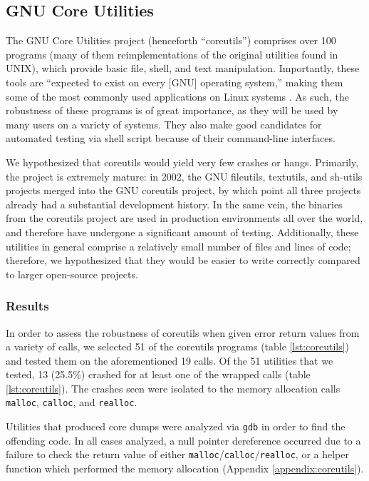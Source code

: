 \subsection{GNU Core Utilities}
The GNU Core Utilities project (henceforth ``coreutils'') comprises over 100 programs (many of them reimplementations of the original utilities found in UNIX), which provide basic file, shell, and text manipulation. Importantly, these tools are ``expected to exist on every [GNU] operating system,'' making them some of the most commonly used applications on Linux systems \cite{coreutils}. As such, the robustness of these programs is of great importance, as they will be used by many users on a variety of systems. They also make good candidates for automated testing via shell script because of their command-line interfaces.

We hypothesized that coreutils would yield very few crashes or hangs. Primarily, the project is extremely mature: in 2002, the GNU fileutils, textutils, and sh-utils projects merged into the GNU coreutils project, by which point all three projects already had a substantial development history. In the same vein, the binaries from the coreutils project are used in production environments all over the world, and therefore have undergone a significant amount of testing. Additionally, these utilities in general comprise a relatively small number of files and lines of code; therefore, we hypothesized that they would be easier to write correctly compared to larger open-source projects.

\subsubsection{Results}
In order to assess the robustness of coreutils when given error return values from a variety of calls, we selected 51 of the coreutils programs (table \ref{lst:coreutils}) and tested them on the aforementioned 19 calls. Of the 51 utilities that we tested, 13 (25.5\%) crashed for at least one of the wrapped calls (table \ref{lst:coreutils}). The crashes seen were isolated to the memory allocation calls \texttt{malloc}, \texttt{calloc}, and \texttt{realloc}. 

Utilities that produced core dumps were analyzed via \texttt{gdb} in order to find the offending code. In all cases analyzed, a null pointer dereference occurred due to a failure to check the return value of either \texttt{malloc}/\texttt{calloc}/\texttt{realloc}, or a helper function which performed the memory allocation (Appendix \ref{appendix:coreutils}).


